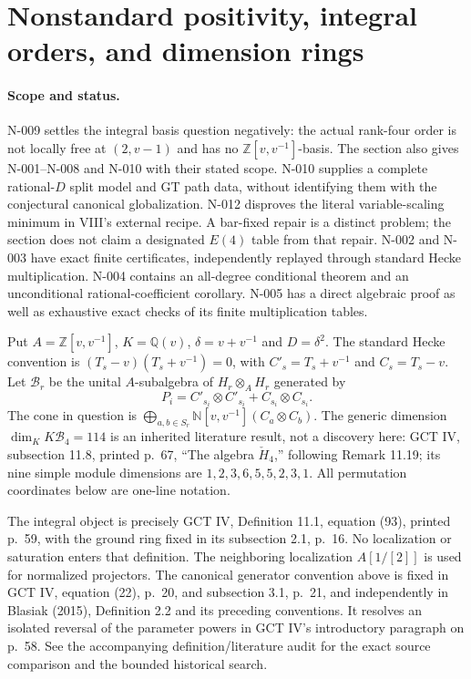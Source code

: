 \section{Nonstandard positivity, integral orders, and dimension rings}
\label{sec:nonstandard-new}

\paragraph{Scope and status.}
N-009 settles the integral basis question negatively: the actual rank-four order is not locally free at $(2,v-1)$ and has no $\mathbb Z[v,v^{-1}]$-basis. The section also gives N-001--N-008 and N-010 with their stated scope. N-010 supplies a complete rational-$D$ split model and GT path data, without identifying them with the conjectural canonical globalization. N-012 disproves the literal variable-scaling minimum in VIII's external recipe. A bar-fixed repair is a distinct problem; the section does not claim a designated $E(4)$ table from that repair.  N-002 and N-003 have exact finite
certificates, independently replayed through standard Hecke multiplication.
N-004 contains an all-degree conditional theorem and an unconditional
rational-coefficient corollary.  N-005 has a direct algebraic proof as well
as exhaustive exact checks of its finite multiplication tables.

Put $A=\mathbb Z[v,v^{-1}]$, $K=\mathbb Q(v)$,
$\delta=v+v^{-1}$ and $D=\delta^2$.  The standard Hecke convention is
$(T_s-v)(T_s+v^{-1})=0$, with $C'_s=T_s+v^{-1}$ and $C_s=T_s-v$.
Let $\mathcal B_r$ be the unital $A$-subalgebra of
$H_r\otimes_A H_r$ generated by
\[
 P_i=C'_{s_i}\otimes C'_{s_i}+C_{s_i}\otimes C_{s_i}.
\]
The cone in question is
$\bigoplus_{a,b\in S_r}\mathbb N[v,v^{-1}](C_a\otimes C_b)$.
The generic dimension $\dim_K K\mathcal B_4=114$ is an inherited
literature result, not a discovery here: GCT IV, subsection 11.8, printed p.~67,
``The algebra $\check H_4$,'' following Remark 11.19; its nine simple
module dimensions are $1,2,3,6,5,5,2,3,1$.
All permutation coordinates below are one-line notation.

The integral object is precisely GCT IV, Definition 11.1, equation (93),
printed p.~59, with the ground ring fixed in its subsection 2.1, p.~16.
No localization or saturation enters that definition.  The neighboring
localization $A[1/[2]]$ is used for normalized projectors.  The canonical
generator convention above is fixed in GCT IV, equation (22), p.~20,
and subsection 3.1, p.~21, and independently in Blasiak (2015),
Definition 2.2 and its preceding conventions.  It resolves an isolated
reversal of the parameter powers in GCT IV's introductory paragraph on
p.~58.  See the accompanying definition/literature audit for the exact
source comparison and the bounded historical search.

